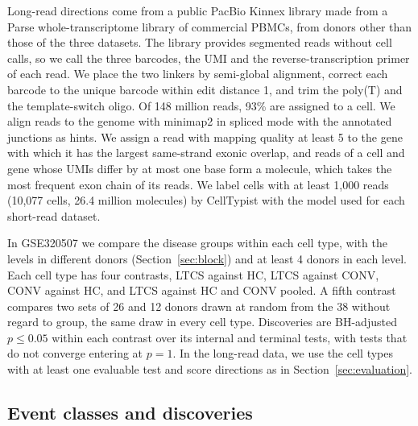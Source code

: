 \documentclass[11pt]{article}
\begin{document}
Long-read directions come from a public PacBio Kinnex library made from a Parse whole-transcriptome library of commercial PBMCs, from donors other than those of the three datasets. The library provides segmented reads without cell calls, so we call the three barcodes, the UMI and the reverse-transcription primer of each read. We place the two linkers by semi-global alignment, correct each barcode to the unique barcode within edit distance 1, and trim the poly(T) and the template-switch oligo. Of 148 million reads, 93\% are assigned to a cell. We align reads to the genome with minimap2 \cite{li2018b} in spliced mode with the annotated junctions as hints. We assign a read with mapping quality at least 5 to the gene with which it has the largest same-strand exonic overlap, and reads of a cell and gene whose UMIs differ by at most one base form a molecule, which takes the most frequent exon chain of its reads. We label cells with at least 1{,}000 reads (10{,}077 cells, 26.4 million molecules) by CellTypist with the model used for each short-read dataset.

In GSE320507 we compare the disease groups within each cell type, with the levels in different donors (Section~\ref{sec:block}) and at least 4 donors in each level. Each cell type has four contrasts, LTCS against HC, LTCS against CONV, CONV against HC, and LTCS against HC and CONV pooled. A fifth contrast compares two sets of 26 and 12 donors drawn at random from the 38 without regard to group, the same draw in every cell type. Discoveries are BH-adjusted $p\le0.05$ within each contrast over its internal and terminal tests, with tests that do not converge entering at $p=1$. In the long-read data, we use the cell types with at least one evaluable test and score directions as in Section~\ref{sec:evaluation}.

\subsection{Event classes and discoveries}
\end{document}
